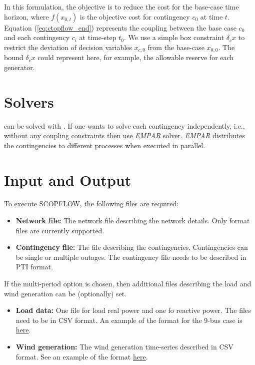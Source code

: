 In this formulation, the objective is to reduce the cost for the base-case time horizon, where $f(x_{0,t})$ is the objective cost for contingency $c_0$ at time $t$. Equation (\ref{eq:ctopflow_end}) represents the coupling between the base case $c_0$ and each contingency $c_i$ at time-step $t_0$. We use a simple box constraint $\delta_c{x}$ to restrict the  deviation of decision variables $x_{c,0}$ from the base-case $x_{0,0}$. The bound $\delta_c{x}$ could represent here, for example, the allowable reserve for each generator.

\section{Solvers}
\scopflow can be solved with \ipopt. If one wants to solve each contingency independently, i.e., without any coupling constraints then use \emph{EMPAR} solver. \emph{EMPAR} distributes the contingencies to different processes when executed in parallel.

\section{Input and Output}
To execute SCOPFLOW, the following files are required:
\begin{itemize}
    \item \textbf{Network file:} The network file describing the network details. Only \matpower format files are currently supported.
    \item \textbf{Contingency file:} The file describing the contingencies. Contingencies can be single or multiple outages. The contingency file needs to be described in PTI format.
\end{itemize}
If the multi-period option is chosen, then additional files describing the load and wind generation can be (optionally) set.
\begin{itemize}
    \item \textbf{Load data:} One file for load real power and one fo reactive power. The files need to be in CSV format. An example of the format for the 9-bus case is \href{https://gitlab.pnnl.gov/exasgd/frameworks/exago/-/tree/master/datafiles/case9}{here}.
    \item \textbf{Wind generation:} The wind generation time-series described in CSV format. See an example of the format \href{https://gitlab.pnnl.gov/exasgd/frameworks/exago/-/tree/master/datafiles/case9}{here}.
\end{itemize}

